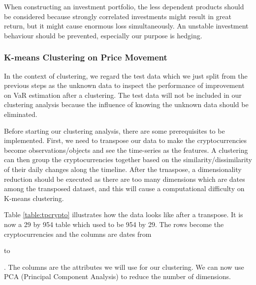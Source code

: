 \documentclass[11pt]{article} %
\theoremstyle{plain}
\theoremstyle{definition}
\begin{document}
When constructing an investment portfolio, the less dependent products should be considered because strongly correlated investments might result in great return, but it might cause enormous loss simultaneously. An unstable investment behaviour should be prevented, especially our purpose is hedging.

\subsubsection{K-means Clustering on Price Movement}

In the context of clustering, we regard the test data which we just split from the previous steps as the unknown data to inspect the performance of improvement on VaR estimation after a clustering. The test data will not be included in our clustering analysis because the influence of knowing the unknown data should be eliminated.

Before starting our clustering analysis, there are some prerequisites to be implemented. First, we need to transpose our data to make the cryptocurrencies become observations/objects and see the time-series as the features. A clustering can then group the cryptocurrencies together based on the similarity/dissimilarity of their daily changes along the timeline. After the trnaspose, a dimensionality reduction should be executed as there are too many dimensions which are dates among the transposed dataset, and this will cause a computational difficulty on K-means clustering.

Table \ref{table:tpcrypto} illustrates how the data looks like after a transpose. It is now a 29 by 954 table which used to be 954 by 29. The rows become the cryptocurrencies and the columns are dates from \date{2016-01-01} to \date{2018-07-31}. The columns are the attributes we will use for our clustering. We can now use PCA (Principal Component Analysis) to reduce the number of dimensions.
\end{document}
